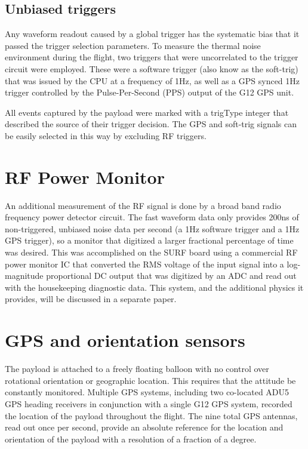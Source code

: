 	\subsection{Unbiased triggers}
		Any waveform readout caused by a global trigger has the systematic bias that it passed the trigger selection parameters.  To measure the thermal noise environment during the flight, two triggers that were uncorrelated to the trigger circuit were employed.  These were a software trigger (also know as the soft-trig) that was issued by the CPU at a frequency of 1Hz, as well as a GPS synced 1Hz trigger controlled by the Pulse-Per-Second (PPS) output of the G12 GPS unit.
		
		All events captured by the payload were marked with a trigType integer that described the source of their trigger decision.  The GPS and soft-trig signals can be easily selected in this way by excluding RF triggers.
		
		
\section{RF Power Monitor}
	An additional measurement of the RF signal is done by a broad band radio frequency power detector circuit.  The fast waveform data only provides 200ns of non-triggered, unbiased noise data per second (a 1Hz software trigger and a 1Hz GPS trigger), so a monitor that digitized a larger fractional percentage of time was desired.  This was accomplished on the SURF board using a commercial RF power monitor IC that converted the RMS voltage of the input signal into a log-magnitude proportional DC output that was digitized by an ADC and read out with the housekeeping diagnostic data.  This system, and the additional physics it provides, will be discussed in a separate paper.

	
\section{GPS and orientation sensors}
	The payload is attached to a freely floating balloon with no control over rotational orientation or geographic location. This requires that the attitude be constantly monitored.  Multiple GPS systems, including two co-located ADU5 GPS heading receivers in conjunction with a single G12 GPS system, recorded the location of the payload throughout the flight.  The nine total GPS antennas, read out once per second, provide an absolute reference for the location and orientation of the payload with a resolution of a fraction of a degree.
	
